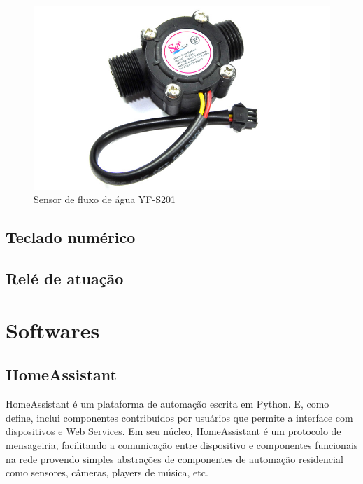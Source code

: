 \begin{figure}[htbp]
		\centering
		\includegraphics[scale=0.3]{figuras/yf-s201.jpg}
		\caption{Sensor de fluxo de água YF-S201}
		\label{fig:03}
\end{figure}

\subsection{Teclado numérico}

\subsection{Relé de atuação}

\section{Softwares}

\subsection{HomeAssistant}

HomeAssistant é um plataforma de automação escrita em Python. E, como \cite{Lundrigan2017} define, inclui componentes contribuídos por usuários que permite a interface com dispositivos e Web Services. Em seu núcleo, HomeAssistant é um protocolo de mensageiria, facilitando a comunicação entre dispositivo e componentes funcionais na rede provendo simples abstrações de componentes de automação residencial como sensores, câmeras, players de música, etc.

